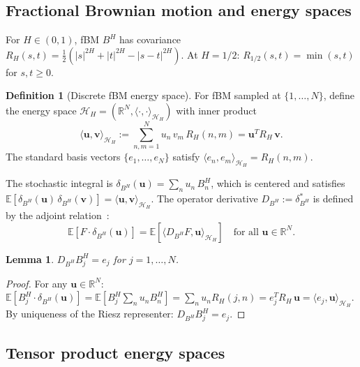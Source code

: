 \documentclass[11pt,a4paper]{article}
\theoremstyle{plain}
\newtheorem{lemma}[theorem]{Lemma}
\theoremstyle{definition}
\newtheorem{definition}[theorem]{Definition}
\theoremstyle{remark}
\newcommand{\E}{\mathbb{E}}
\newcommand{\R}{\mathbb{R}}
\newcommand{\HH}{\mathcal{H}_H}
\begin{document}
\subsection{Fractional Brownian motion and energy spaces}

For $H \in (0,1)$, fBM $B^H$ has covariance
$R_H(s,t) = \frac{1}{2}(|s|^{2H} + |t|^{2H}
- |s-t|^{2H})$.
At $H = 1/2$: $R_{1/2}(s,t) = \min(s,t)$ for $s,t \geq 0$.

\begin{definition}[Discrete fBM energy space]
\label{def:discrete-energy}
For fBM sampled at $\{1,\ldots,N\}$, define the energy
space $\HH = (\R^N, \langle\cdot,\cdot\rangle_{\HH})$
with inner product
\begin{equation}\label{eq:HH-ip}
  \langle \mathbf{u}, \mathbf{v} \rangle_{\HH}
  := \sum_{n,m=1}^N u_n\,v_m\,R_H(n,m)
  = \mathbf{u}^T R_H\,\mathbf{v}.
\end{equation}
The standard basis vectors $\{e_1,\ldots,e_N\}$
satisfy $\langle e_n, e_m \rangle_{\HH} = R_H(n,m)$.
\end{definition}

The stochastic integral is
$\delta_{B^H}(\mathbf{u}) = \sum_n u_n\,B_n^H$,
which is centered and satisfies
$\E[\delta_{B^H}(\mathbf{u})\,\delta_{B^H}(\mathbf{v})]
= \langle \mathbf{u}, \mathbf{v} \rangle_{\HH}$.
The operator derivative $D_{B^H} := \delta_{B^H}^*$
is defined by the adjoint relation~\cite{Fontes2026opderiv}:
\begin{equation}\label{eq:adj}
  \E[F \cdot \delta_{B^H}(\mathbf{u})]
  = \E[\langle D_{B^H} F, \mathbf{u} \rangle_{\HH}]
  \quad \text{for all } \mathbf{u} \in \R^N.
\end{equation}

\begin{lemma}\label{lem:D-of-BH}
$D_{B^H} B_j^H = e_j$ for $j = 1,\ldots,N$.
\end{lemma}

\begin{proof}
For any $\mathbf{u} \in \R^N$:
$\E[B_j^H \cdot \delta_{B^H}(\mathbf{u})]
= \E[B_j^H \sum_n u_n B_n^H]
= \sum_n u_n R_H(j,n)
= e_j^T R_H\,\mathbf{u}
= \langle e_j, \mathbf{u} \rangle_{\HH}$.
By uniqueness of the Riesz representer:
$D_{B^H} B_j^H = e_j$.
\end{proof}


\subsection{Tensor product energy spaces}
\end{document}
